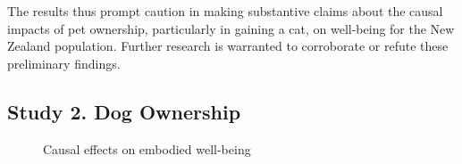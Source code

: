 \documentclass[
  singlecolumn,
  9pt]{article}
\begin{document}
The results thus prompt caution in making substantive claims about the
causal impacts of pet ownership, particularly in gaining a cat, on
well-being for the New Zealand population. Further research is warranted
to corroborate or refute these preliminary findings.

\newpage{}

\subsection{Study 2. Dog Ownership}\label{study-2.-dog-ownership}

\begin{figure}


\caption{\label{fig-results-health-dogs}Causal effects on embodied
well-being}

\end{figure}%

\newpage{}
\end{document}
